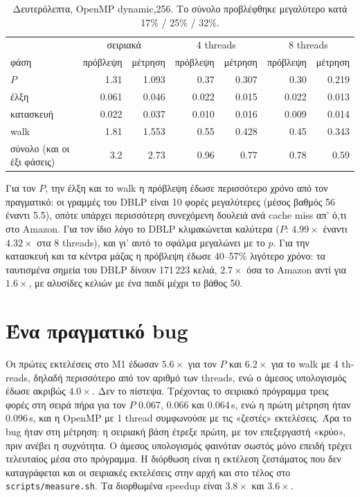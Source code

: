 \documentclass[10pt,a4paper]{article}
\newcommand{\en}[1]{\textlatin{#1}}
\let\origtexttt\texttt
\renewcommand{\texttt}[1]{\textlatin{\origtexttt{#1}}}
\begin{document}
\begin{table}[h]
\centering\small
\begin{tabular}{@{}lrrrrrr@{}}
\toprule
 & \multicolumn{2}{c}{σειριακά} & \multicolumn{2}{c}{4 \en{threads}} & \multicolumn{2}{c}{8 \en{threads}}\\
φάση & πρόβλεψη & μέτρηση & πρόβλεψη & μέτρηση & πρόβλεψη & μέτρηση \\
\midrule
$P$          & 1.31   & 1.093  & 0.37  & 0.307 & 0.30  & 0.219 \\
έλξη         & 0.061  & 0.046  & 0.022 & 0.015 & 0.022 & 0.013 \\
κατασκευή    & 0.022  & 0.037  & 0.010 & 0.016 & 0.009 & 0.014 \\
\en{walk}    & 1.81   & 1.553  & 0.55  & 0.428 & 0.45  & 0.343 \\
σύνολο (και οι έξι φάσεις) & 3.2 & 2.73 & 0.96 & 0.77 & 0.78 & 0.59 \\
\bottomrule
\end{tabular}
\caption{Δευτερόλεπτα, \en{OpenMP dynamic,256}. Το σύνολο προβλέφθηκε μεγαλύτερο κατά 17\% / 25\% /
32\%.}
\vspace{-4pt}
\end{table}

Για τον $P$, την έλξη και το \en{walk} η πρόβλεψη έδωσε περισσότερο χρόνο από τον πραγματικό: οι
γραμμές του \en{DBLP} είναι 10 φορές μεγαλύτερες (μέσος βαθμός 56 έναντι 5.5), οπότε υπάρχει
περισσότερη συνεχόμενη δουλειά ανά \en{cache miss} απ' ό,τι στο \en{Amazon}. Για τον ίδιο λόγο το
\en{DBLP} κλιμακώνεται καλύτερα ($P$: $4.99\times$ έναντι $4.32\times$ στα 8 \en{threads}), και γι'
αυτό το σφάλμα μεγαλώνει με το $p$. Για την κατασκευή και τα κέντρα μάζας η πρόβλεψη έδωσε
40--57\% λιγότερο χρόνο: τα ταυτισμένα σημεία του \en{DBLP} δίνουν 171\,223 κελιά, $2.7\times$ όσα
το \en{Amazon} αντί για $1.6\times$, με αλυσίδες κελιών με ένα παιδί μέχρι το βάθος 50.

\section{Ένα πραγματικό \en{bug}}

Οι πρώτες εκτελέσεις στο \en{M1} έδωσαν $5.6\times$ για τον $P$ και $6.2\times$ για το \en{walk}
με 4 \en{threads}, δηλαδή περισσότερο από τον αριθμό των \en{threads}, ενώ ο άμεσος υπολογισμός
έδωσε ακριβώς $4.0\times$. Δεν το πίστεψα. Τρέχοντας το σειριακό πρόγραμμα τρεις φορές στη σειρά
πήρα για τον $P$ 0.067, 0.066 και 0.064\,\en{s}, ενώ η πρώτη μέτρηση ήταν 0.096\,\en{s}, και η
\en{OpenMP} με 1 \en{thread} συμφωνούσε με τις «ζεστές» εκτελέσεις. Άρα το \en{bug} ήταν στη μέτρηση:
η σειριακή βάση έτρεξε πρώτη, με τον επεξεργαστή «κρύο», πριν ανέβει η συχνότητα. Ο άμεσος
υπολογισμός φαινόταν σωστός μόνο επειδή τρέχει τελευταίος μέσα στο πρόγραμμα. Η διόρθωση είναι η
εκτέλεση ζεστάματος που δεν καταγράφεται και οι σειριακές εκτελέσεις στην αρχή και στο τέλος στο
\texttt{scripts/measure.sh}. Τα διορθωμένα \en{speedup} είναι $3.8\times$ και $3.6\times$.
\end{document}
